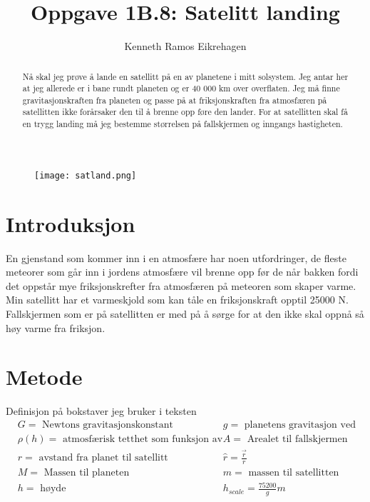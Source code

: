 \documentclass[12pt,preprint]{aastex6}
\begin{document}
\title{Oppgave 1B.8: Satelitt landing}

\author{Kenneth Ramos Eikrehagen}


\newpage
\begin{figure}[ht]
\texttt{[image: satland.png]}
\end{figure}

\begin{abstract}
Nå skal jeg prøve å lande en satellitt på en av planetene i mitt solsystem. Jeg antar her at jeg allerede er i bane rundt planeten og er 40 000 km over overflaten. Jeg må finne gravitasjonskraften fra planeten og passe på at friksjonskraften fra atmosfæren på satellitten ikke forårsaker den til å brenne opp føre den lander. For at satellitten skal få en trygg landing må jeg bestemme størrelsen på fallskjermen og inngangs hastigheten. 
\end{abstract}

\section{Introduksjon}
\label{sect:intro}
En gjenstand som kommer inn i en atmosfære har noen utfordringer, de fleste meteorer  som går inn i jordens atmosfære vil brenne opp før de når bakken fordi det oppstår mye friksjonskrefter fra atmosfæren på meteoren som skaper varme. Min satellitt har et varmeskjold som kan tåle en friksjonskraft opptil 25000 N. Fallskjermen som er på satellitten er med på å sørge for at den ikke skal oppnå så høy varme fra friksjon. 

\section{Metode}
Definisjon på bokstaver jeg bruker i teksten
\begin{align*}
&G = \text{ Newtons gravitasjonskonstant} && g = \text{ planetens gravitasjon ved overflaten}\\
&\rho(h) = \text{ atmosfærisk tetthet som funksjon av høyden}&& A = \text{ Arealet til fallskjermen} \\
&r = \text{ avstand fra planet til satellitt} && \hat{r} =  \frac{\vec{r}}{r} \\
& M = \text{ Massen til planeten} && m = \text{ massen til satellitten}\\
&h = \text{ høyde} && h_{scale}=  \frac{75200}{g} m \\
\end{align*}
\end{document}
